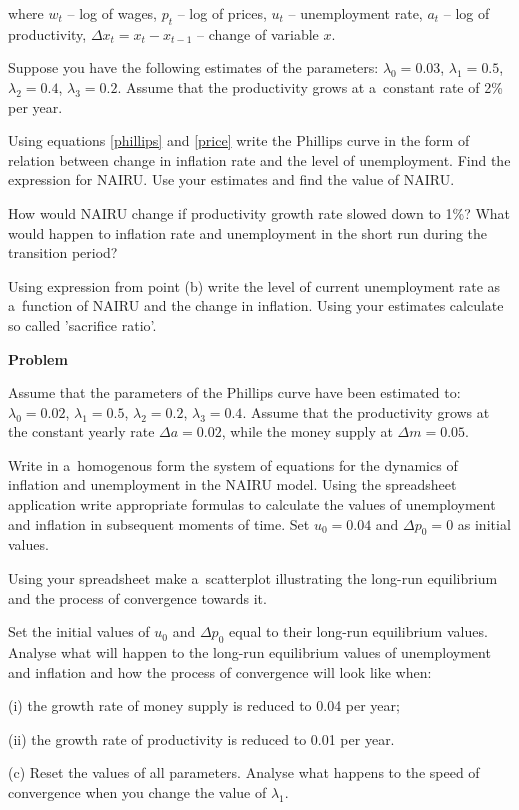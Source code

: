 \documentclass[a4paper, notitlepage, 11pt]{article}
\newcounter{zadlicz}[section]%
\newcommand{\tytul}[2]{\setcounter{equation}{0}\addtocounter{zadlicz}{1}\vspace{\abovedisplayskip}\noindent\textbf{#1\ \thezadlicz #2}}%
\begin{document}
where $w_t$ -- log of wages, $p_t$ -- log of prices, $u_t$ -- unemployment rate, $a_t$ -- log of productivity, $\Delta x_t=x_t-x_{t-1}$ -- change of variable $x$.

Suppose you have the following estimates of the parameters: $\lambda_0=0.03$, $\lambda_1=0.5$, $\lambda_2=0.4$, $\lambda_3=0.2$. Assume that the productivity grows at a~constant rate of 2\% per year.

\begin{wylicz}
\item Using equations \eqref{phillips} and \eqref{price} write the Phillips curve in the form of relation between change in inflation rate and the level of unemployment. Find the expression for NAIRU. Use your estimates and find the value of NAIRU.
\item How would NAIRU change if productivity growth rate slowed down to 1\%? What would happen to inflation rate and unemployment in the short run during the transition period?
\item Using expression from point (b) write the level of current unemployment rate as a~function of NAIRU and the change in inflation. Using your estimates calculate so called 'sacrifice ratio'.
\end{wylicz}

\tytul{Problem}{}

\noindent%
Assume that the parameters of the Phillips curve have been estimated to: $\lambda_0=0.02$, $\lambda_1=0.5$, $\lambda_2=0.2$, $\lambda_3=0.4$. Assume that the productivity grows at the constant yearly rate $\Delta a=0.02$, while the money supply at $\Delta m=0.05$.

Write in a~homogenous form the system of equations for the dynamics of inflation and unemployment in the NAIRU model. Using the spreadsheet application write appropriate formulas to calculate the values of unemployment and inflation in subsequent moments of time. Set $u_0=0.04$ and $\Delta p_0=0$ as initial values.

\begin{wylicz}
\item Using your spreadsheet make a~scatterplot illustrating the long-run equilibrium and the process of convergence towards it.
\item Set the initial values of $u_0$ and $\Delta p_0$ equal to their long-run equilibrium values. Analyse what will happen to the long-run equilibrium values of unemployment and inflation and how the process of convergence will look like when:
    \begin{wylicz}
      \item[(i)] the growth rate of money supply is reduced to 0.04 per year;
      \item[(ii)] the growth rate of productivity is reduced to 0.01 per year.
    \end{wylicz}
\item[(c)] Reset the values of all parameters. Analyse what happens to the speed of convergence when you change the value of $\lambda_1$.
\end{wylicz}
\end{document}
